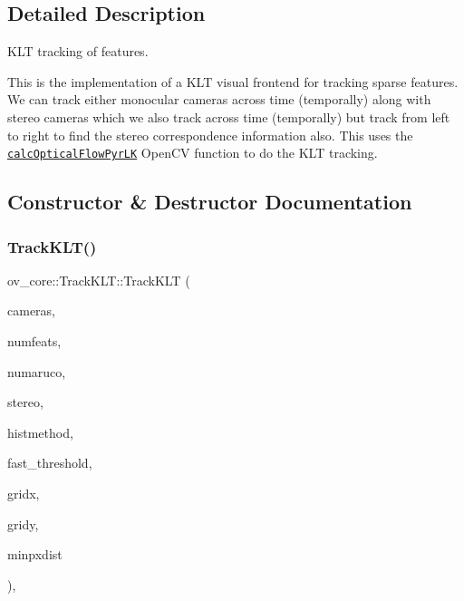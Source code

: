 \subsection{Detailed Description}
K\+LT tracking of features. 

This is the implementation of a K\+LT visual frontend for tracking sparse features. We can track either monocular cameras across time (temporally) along with stereo cameras which we also track across time (temporally) but track from left to right to find the stereo correspondence information also. This uses the \href{https://github.com/opencv/opencv/blob/master/modules/video/src/lkpyramid.cpp}{\tt calc\+Optical\+Flow\+Pyr\+LK} Open\+CV function to do the K\+LT tracking. 

\subsection{Constructor \& Destructor Documentation}
\mbox{\label{classov__core_1_1TrackKLT_acb59382fb0893c546e612fa20ca0672b}} 
\subsubsection{\texorpdfstring{Track\+K\+L\+T()}{TrackKLT()}}
{\footnotesize\ttfamily ov\+\_\+core\+::\+Track\+K\+L\+T\+::\+Track\+K\+LT (\begin{DoxyParamCaption}\item[{std\+::unordered\+\_\+map$<$ size\+\_\+t, std\+::shared\+\_\+ptr$<$ \hyperlink{classov__core_1_1CamBase}{Cam\+Base} $>$$>$}]{cameras,  }\item[{int}]{numfeats,  }\item[{int}]{numaruco,  }\item[{bool}]{stereo,  }\item[{\hyperlink{classov__core_1_1TrackBase_aa4b34a5dce99b59522d57bf9278c9a1a}{Histogram\+Method}}]{histmethod,  }\item[{int}]{fast\+\_\+threshold,  }\item[{int}]{gridx,  }\item[{int}]{gridy,  }\item[{int}]{minpxdist }\end{DoxyParamCaption})\hspace{0.3cm}{\ttfamily [inline]}, {\ttfamily [explicit]}}



